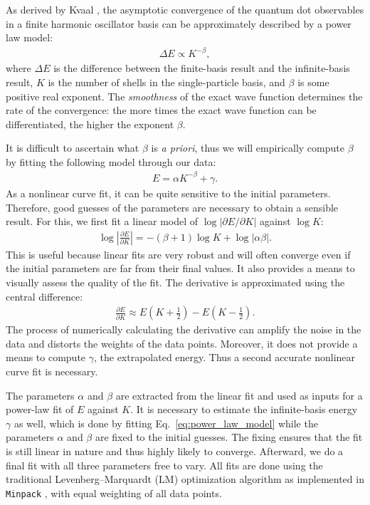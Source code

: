 As derived by Kvaal \cite{PhysRevB.80.045321,Kvaal2007}, the asymptotic convergence of the quantum dot observables in a finite harmonic oscillator basis can be approximately described by a power law model:
\begin{align*}
  \Delta E \propto K^{-\beta},
\end{align*}
where $\Delta E$ is the difference between the finite-basis result and the infinite-basis result, $K$ is the number of shells in the single-particle basis, and $\beta$ is some positive real exponent.  The \textit{smoothness} of the exact wave function determines the rate of the convergence: the more times the exact wave function can be differentiated, the higher the exponent $\beta$.

It is difficult to ascertain what $\beta$ is \textit{a priori}, thus we will empirically compute $\beta$ by fitting the following model through our data:
\begin{align} \label{eq:power_law_model}
  E = \alpha K^{-\beta} + \gamma.
\end{align}
As a nonlinear curve fit, it can be quite sensitive to the initial parameters.  Therefore, good guesses of the parameters are necessary to obtain a sensible result.  For this, we first fit a linear model of $\log |\partial E / \partial K|$ against $\log K$:
\begin{align*}
  \log \left|\frac{\partial E}{\partial K}\right| = - (\beta + 1) \log K + \log|\alpha \beta|.
\end{align*}
This is useful because linear fits are very robust and will often converge even if the initial parameters are far from their final values.  It also provides a means to visually assess the quality of the fit.  The derivative is approximated using the central difference:
\begin{align*}
  \frac{\partial E}{\partial K} \approx E\left(K + \frac{1}{2}\right) - E\left(K - \frac{1}{2}\right).
\end{align*}
The process of numerically calculating the derivative can amplify the noise in the data and distorts the weights of the data points.  Moreover, it does not provide a means to compute $\gamma$, the extrapolated energy.  Thus a second accurate nonlinear curve fit is necessary.

The parameters $\alpha$ and $\beta$ are extracted from the linear fit and used as inputs for a power-law fit of $E$ against $K$.  It is necessary to estimate the infinite-basis energy $\gamma$ as well, which is done by fitting Eq.\ \eqref{eq:power_law_model} while the parameters $\alpha$ and $\beta$ are fixed to the initial guesses.  The fixing ensures that the fit is still linear in nature and thus highly likely to converge.  Afterward, we do a final fit with all three parameters free to vary.  All fits are done using the traditional Levenberg--Marquardt (LM) optimization algorithm \cite{10.2307/43633451,doi:10.1137/0111030} as implemented in \texttt{Minpack} \cite{More1978,More:126569}, with equal weighting of all data points.

